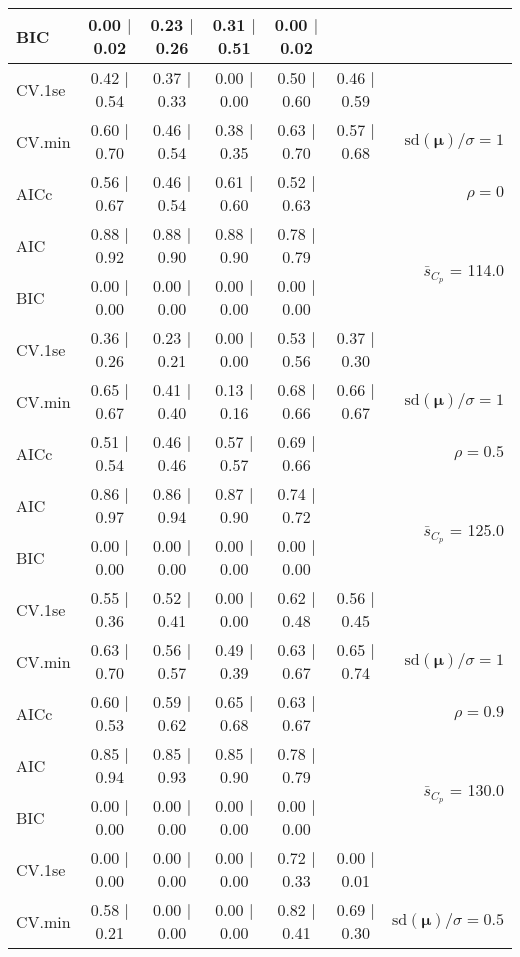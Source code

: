 \documentclass[12pt]{article}
\newcommand{\mr}[1]{\mathrm{#1}}
\newcommand{\bm}[1]{\mathbf{#1}}
\begin{document}
\begin{table}[p]
\begin{center}
\begin{tabular}{l*{5}{c}|r}
BIC & 0.00 $\mid$ 0.02 & 0.23 $\mid$ 0.26 & 0.31 $\mid$ 0.51 & 0.00 $\mid$ 0.02 & & \\
 \hline 
CV.1se & 0.42 $\mid$ 0.54 & 0.37 $\mid$ 0.33 & 0.00 $\mid$ 0.00 & 0.50 $\mid$ 0.60 & 0.46 $\mid$ 0.59 &\\
CV.min & 0.60 $\mid$ 0.70 & 0.46 $\mid$ 0.54 & 0.38 $\mid$ 0.35 & 0.63 $\mid$ 0.70 & 0.57 $\mid$ 0.68 &  $\mr{sd}(\bm{\mu})/\sigma=1$ \\
AICc & 0.56 $\mid$ 0.67 & 0.46 $\mid$ 0.54 & 0.61 $\mid$ 0.60 & 0.52 $\mid$ 0.63 & & $\rho=0$ \\
AIC & 0.88 $\mid$ 0.92 & 0.88 $\mid$ 0.90 & 0.88 $\mid$ 0.90 & 0.78 $\mid$ 0.79 & & \multirow{2}{*}{$\bar{s}_{C_p}$ = 114.0} \\
BIC & 0.00 $\mid$ 0.00 & 0.00 $\mid$ 0.00 & 0.00 $\mid$ 0.00 & 0.00 $\mid$ 0.00 & & \\
 \hline 
CV.1se & 0.36 $\mid$ 0.26 & 0.23 $\mid$ 0.21 & 0.00 $\mid$ 0.00 & 0.53 $\mid$ 0.56 & 0.37 $\mid$ 0.30 &\\
CV.min & 0.65 $\mid$ 0.67 & 0.41 $\mid$ 0.40 & 0.13 $\mid$ 0.16 & 0.68 $\mid$ 0.66 & 0.66 $\mid$ 0.67 &  $\mr{sd}(\bm{\mu})/\sigma=1$ \\
AICc & 0.51 $\mid$ 0.54 & 0.46 $\mid$ 0.46 & 0.57 $\mid$ 0.57 & 0.69 $\mid$ 0.66 & & $\rho=0.5$ \\
AIC & 0.86 $\mid$ 0.97 & 0.86 $\mid$ 0.94 & 0.87 $\mid$ 0.90 & 0.74 $\mid$ 0.72 & & \multirow{2}{*}{$\bar{s}_{C_p}$ = 125.0} \\
BIC & 0.00 $\mid$ 0.00 & 0.00 $\mid$ 0.00 & 0.00 $\mid$ 0.00 & 0.00 $\mid$ 0.00 & & \\
 \hline 
CV.1se & 0.55 $\mid$ 0.36 & 0.52 $\mid$ 0.41 & 0.00 $\mid$ 0.00 & 0.62 $\mid$ 0.48 & 0.56 $\mid$ 0.45 &\\
CV.min & 0.63 $\mid$ 0.70 & 0.56 $\mid$ 0.57 & 0.49 $\mid$ 0.39 & 0.63 $\mid$ 0.67 & 0.65 $\mid$ 0.74 &  $\mr{sd}(\bm{\mu})/\sigma=1$ \\
AICc & 0.60 $\mid$ 0.53 & 0.59 $\mid$ 0.62 & 0.65 $\mid$ 0.68 & 0.63 $\mid$ 0.67 & & $\rho=0.9$ \\
AIC & 0.85 $\mid$ 0.94 & 0.85 $\mid$ 0.93 & 0.85 $\mid$ 0.90 & 0.78 $\mid$ 0.79 & & \multirow{2}{*}{$\bar{s}_{C_p}$ = 130.0} \\
BIC & 0.00 $\mid$ 0.00 & 0.00 $\mid$ 0.00 & 0.00 $\mid$ 0.00 & 0.00 $\mid$ 0.00 & & \\
 \hline 
CV.1se & 0.00 $\mid$ 0.00 & 0.00 $\mid$ 0.00 & 0.00 $\mid$ 0.00 & 0.72 $\mid$ 0.33 & 0.00 $\mid$ 0.01 &\\
CV.min & 0.58 $\mid$ 0.21 & 0.00 $\mid$ 0.00 & 0.00 $\mid$ 0.00 & 0.82 $\mid$ 0.41 & 0.69 $\mid$ 0.30 &  $\mr{sd}(\bm{\mu})/\sigma=0.5$ \\

\end{tabular}
\end{center}
\end{table}
\end{document}
